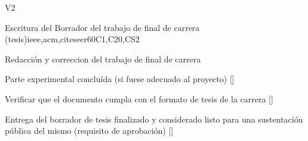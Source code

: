 \begin{syllabus}
\begin{competences}{V2}
\item {} 
\item {}
\item {}
\end{competences}

\begin{unit}{Escritura del Borrador del trabajo de final de carrera (tesis)}{}{ieee,acm,citeseer}{60}{C1,C20,CS2}
\begin{topics}
    \item Redacción y correccion del trabajo de final de carrera
\end{topics}

\begin{learningoutcomes}
    \item Parte experimental concluída (si fuese adecuado al proyecto) [\Assessment]
    \item Verificar que el documento cumpla con el formato de tesis de la carrera [\Assessment]
    \item Entrega del borrador de tesis finalizado y considerado listo para una sustentación pública del mismo (requisito de aprobación) [\Assessment]
\end{learningoutcomes}
\end{unit}

\begin{coursebibliography}
\end{coursebibliography}
\end{syllabus}
